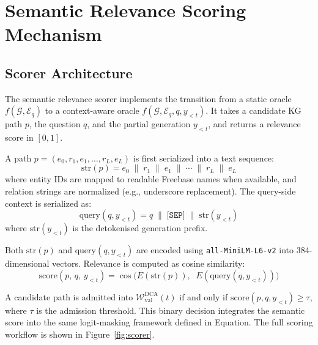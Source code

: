 \section{Semantic Relevance Scoring Mechanism}
\label{sec:ch3scorer}

\subsection{Scorer Architecture}

The semantic relevance scorer implements the transition from a static oracle $f(\mathcal{G}, \mathcal{E}_q)$ to a context-aware oracle $f(\mathcal{G}, \mathcal{E}_q, q, y_{<t})$. It takes a candidate KG path $p$, the question $q$, and the partial generation $y_{<t}$, and returns a relevance score in $[0,1]$.

A path $p = (e_0, r_1, e_1, \ldots, r_L, e_L)$ is first serialized into a text sequence:
\begin{equation}
  \text{str}(p) = e_0 \;\|\; r_1 \;\|\; e_1 \;\|\; \cdots \;\|\; r_L \;\|\; e_L
  \label{eq:pathstr}
\end{equation}
where entity IDs are mapped to readable Freebase names when available, and relation strings are normalized (e.g., underscore replacement). The query-side context is serialized as:
\begin{equation}
  \text{query}(q, y_{<t}) = q \;\|\; \texttt{[SEP]} \;\|\;
  \text{str}(y_{<t})
  \label{eq:querystr}
\end{equation}
where $\text{str}(y_{<t})$ is the detokenised generation prefix.

Both $\text{str}(p)$ and $\text{query}(q, y_{<t})$ are encoded using \texttt{all-MiniLM-L6-v2} \citep{reimers2019sbert} into 384-dimensional vectors. Relevance is computed as cosine similarity:
\begin{equation}
  \text{score}(p,\, q,\, y_{<t}) = \cos\!\bigl(
  E\!\left(\text{str}(p)\right),\;\;
  E\!\left(\text{query}(q, y_{<t})\right)
  \bigr)
  \label{eq:scorer}
\end{equation}

A candidate path is admitted into $\mathcal{W}_{\text{val}}^{\text{DCA}}(t)$ if and only if $\text{score}(p, q, y_{<t}) \geq \tau$, where $\tau$ is the admission threshold. This binary decision integrates the semantic score into the same logit-masking framework defined in Equation. The full scoring workflow is shown in Figure~\ref{fig:scorer}.

